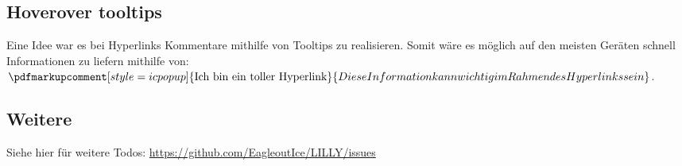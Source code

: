 \subsection{Hoverover tooltips}

Eine Idee war es bei Hyperlinks Kommentare mithilfe von Tooltips zu realisieren. Somit wäre es möglich auf den meisten Geräten schnell Informationen zu liefern mithilfe von: $\pdfmarkupcomment[style=icpopup]{\text{Ich bin ein toller Hyperlink}}{Diese Information kann wichtig im Rahmen des Hyperlinks sein}$.

\subsection{Weitere}
Siehe hier für weitere Todos: \url{https://github.com/EagleoutIce/LILLY/issues}